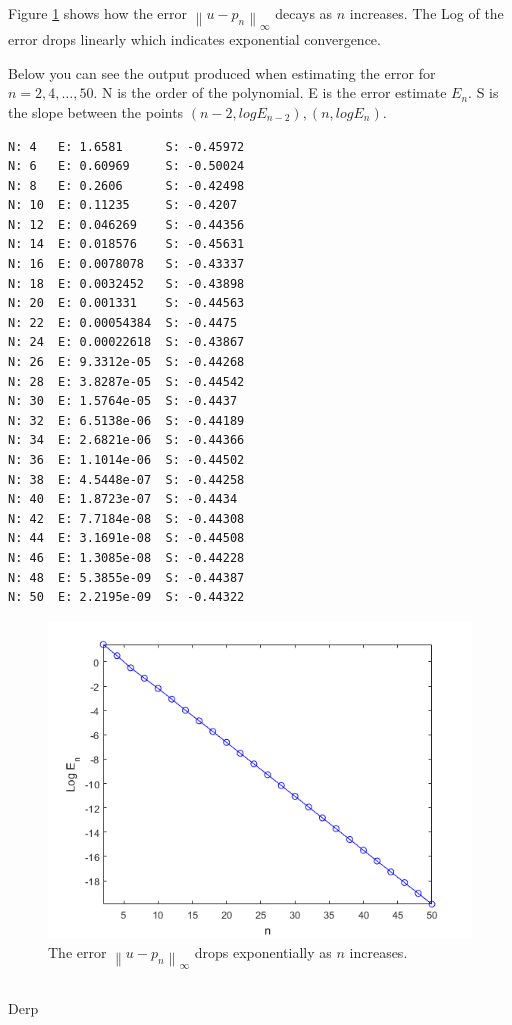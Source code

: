 \documentclass[12pt]{article}
\newcommand{\norm}[1]{\left\lVert#1\right\rVert}
\begin{document}
Figure \ref{fig_pt_log_err} shows how the error $\norm{u-p_n}_{\infty}$ decays as $n$ increases. The Log of the error drops linearly which indicates exponential convergence.

Below you can see the output produced when estimating the error for $n = 2, 4, \ldots, 50$.
N is the order of the polynomial. E is the error estimate $E_n$. S is the slope between 
the points $(n-2, log E_{n-2}), (n, log E_n)$.

\begin{minipage}{\linewidth}
\begin{lstlisting}
N: 4   E: 1.6581      S: -0.45972
N: 6   E: 0.60969     S: -0.50024
N: 8   E: 0.2606      S: -0.42498
N: 10  E: 0.11235     S: -0.4207
N: 12  E: 0.046269    S: -0.44356
N: 14  E: 0.018576    S: -0.45631
N: 16  E: 0.0078078   S: -0.43337
N: 18  E: 0.0032452   S: -0.43898
N: 20  E: 0.001331    S: -0.44563
N: 22  E: 0.00054384  S: -0.4475
N: 24  E: 0.00022618  S: -0.43867
N: 26  E: 9.3312e-05  S: -0.44268
N: 28  E: 3.8287e-05  S: -0.44542
N: 30  E: 1.5764e-05  S: -0.4437
N: 32  E: 6.5138e-06  S: -0.44189
N: 34  E: 2.6821e-06  S: -0.44366
N: 36  E: 1.1014e-06  S: -0.44502
N: 38  E: 4.5448e-07  S: -0.44258
N: 40  E: 1.8723e-07  S: -0.4434
N: 42  E: 7.7184e-08  S: -0.44308
N: 44  E: 3.1691e-08  S: -0.44508
N: 46  E: 1.3085e-08  S: -0.44228
N: 48  E: 5.3855e-09  S: -0.44387
N: 50  E: 2.2195e-09  S: -0.44322
\end{lstlisting}
\end{minipage}

\begin{figure}
    \includegraphics[width=.6\linewidth]{pt_log_err}
    \centering
    \caption{The error $\norm{u-p_n}_{\infty}$ drops exponentially as $n$ increases.}
    \label{fig_pt_log_err}
\end{figure}


\subsection{} %
Derp
\end{document}
